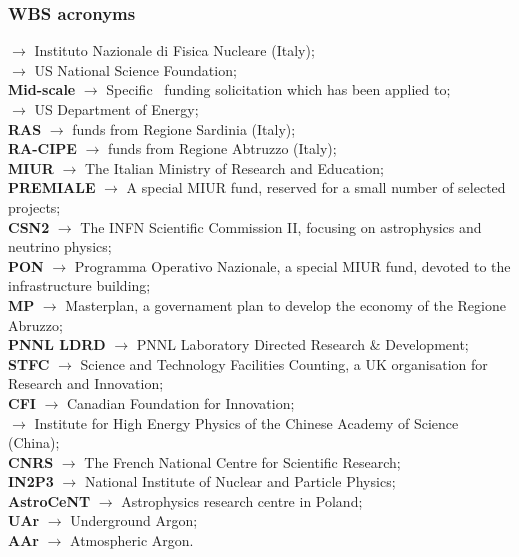 \subsubsection{WBS acronyms}
\noindent {\bf \INFN} $\rightarrow$ Instituto Nazionale di Fisica Nucleare (Italy);\\
{\bf \NSF} $\rightarrow$ US National Science Foundation;\\
{\bf \NSF Mid-scale} $\rightarrow$ Specific \NSF\ funding solicitation which has been applied to;\\
{\bf \DOE} $\rightarrow$ US Department of Energy; \\
{\bf RAS} $\rightarrow$ funds from Regione Sardinia (Italy);\\
{\bf RA-CIPE} $\rightarrow$ funds from Regione Abtruzzo (Italy);\\
{\bf MIUR} $\rightarrow$ The Italian Ministry of Research and Education;\\
{\bf PREMIALE} $\rightarrow$ A special MIUR fund, reserved for a small number of selected projects;\\
{\bf CSN2} $\rightarrow$ The INFN Scientific Commission II, focusing on astrophysics and neutrino physics;\\
{\bf PON} $\rightarrow$ Programma Operativo Nazionale, a special MIUR fund, devoted to the infrastructure building;\\
{\bf MP} $\rightarrow$ Masterplan, a governament plan to develop the economy of the Regione Abruzzo;\\ 
{\bf PNNL LDRD} $\rightarrow$ PNNL Laboratory Directed Research \& Development;\\
{\bf STFC} $\rightarrow$ Science and Technology Facilities Counting, a UK organisation for Research and Innovation;\\ 
{\bf CFI} $\rightarrow$ Canadian Foundation for Innovation;\\
{\bf \IHEP} $\rightarrow$ Institute for High Energy Physics of the Chinese Academy of Science (China);\\
{\bf CNRS} $\rightarrow$ The French National Centre for Scientific Research;\\
{\bf IN2P3} $\rightarrow$ National Institute of Nuclear and Particle Physics;\\
{\bf AstroCeNT} $\rightarrow$ Astrophysics research centre in Poland;\\
{\bf UAr} $\rightarrow$ Underground Argon;\\
{\bf AAr} $\rightarrow$ Atmospheric Argon.\\


